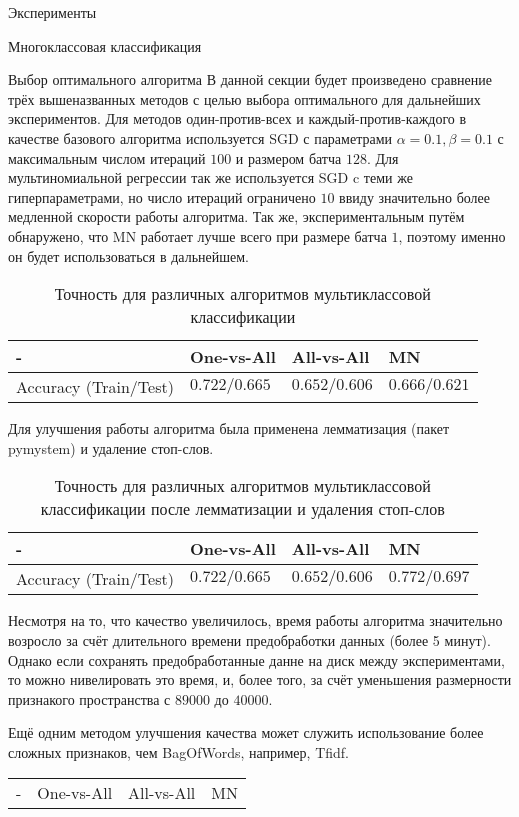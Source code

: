 \documentclass[a4paper,12pt,titlepage,finall]{article}
\begin{document}
\begin{section}{Эксперименты}
\begin{subsection}{Многоклассовая классификация}
	
\begin{subsubsection}{Выбор оптимального алгоритма}
	В данной секции будет произведено сравнение трёх вышеназванных методов с целью выбора оптимального для дальнейших экспериментов.
	Для методов один-против-всех и каждый-против-каждого в качестве базового алгоритма используется SGD с параметрами $\alpha=0.1, \beta=0.1$ с максимальным числом итераций $100$ и размером батча $128$. Для мультиномиальной регрессии так же используется SGD c теми же гиперпараметрами, но число итераций ограничено $10$ ввиду значительно более медленной скорости работы алгоритма. Так же, экспериментальным путём обнаружено, что MN работает лучше всего при размере батча $1$, поэтому именно он будет использоваться в дальнейшем.
\begin{table}[H]
	\begin{tabular}{l|lll}
		- & One-vs-All & All-vs-All & MN \\
		 \hline
		Accuracy (Train/Test) & $0.722/0.665$ & $0.652/0.606$ & $0.666/0.621$ \\
	\end{tabular}
	\centering
	\caption{Точность для различных алгоритмов мультиклассовой классификации}
	\label{tbl:1}
\end{table}
	Для улучшения работы алгоритма была применена лемматизация (пакет pymystem) и удаление стоп-слов. 
\begin{table}[H]
	\begin{tabular}{l|lll}
		- & One-vs-All & All-vs-All & MN \\
		\hline
		Accuracy (Train/Test) & $0.722/0.665$ & $0.652/0.606$ & $0.772/0.697$ \\
	\end{tabular}
	\centering
	\caption{Точность для различных алгоритмов мультиклассовой классификации после лемматизации и удаления стоп-слов}
	\label{tbl:2}
\end{table}
Несмотря на то, что качество увеличилось, время работы алгоритма значительно возросло за счёт длительного времени предобработки данных (более 5 минут). Однако если сохранять предобработанные данне на диск между экспериментами, то можно нивелировать это время, и, более того, за счёт уменьшения размерности признакого пространства с $89000$ до $40000$.
\par
Ещё одним методом улучшения качества может служить использование более сложных признаков, чем BagOfWords, например, Tfidf.
\begin{table}[H]
	\begin{tabular}{l|lll}
		- & One-vs-All & All-vs-All & MN \\

\end{tabular}
\end{table}
\end{subsubsection}
\end{subsection}
\end{section}
\end{document}
